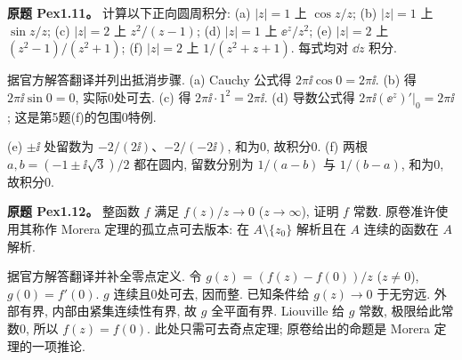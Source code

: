 \begin{exercise}\label{ass:pex1-11}
\textbf{原题 Pex1.11。} 计算以下正向圆周积分: (a) $|z|=1$ 上 $\cos z/z$; (b) $|z|=1$ 上 $\sin z/z$; (c) $|z|=2$ 上 $z^2/(z-1)$; (d) $|z|=1$ 上 $\ee^z/z^2$; (e) $|z|=2$ 上 $(z^2-1)/(z^2+1)$; (f) $|z|=2$ 上 $1/(z^2+z+1)$. 每式均对 $\dd z$ 积分.
\end{exercise}
\begin{solution}
据官方解答翻译并列出抵消步骤. (a) Cauchy 公式得 $2\pi\ii\cos0=2\pi\ii$. (b) 得 $2\pi\ii\sin0=0$, 实际0处可去. (c) 得 $2\pi\ii\cdot1^2=2\pi\ii$. (d) 导数公式得 $2\pi\ii(\ee^z)'|_0=2\pi\ii$; 这是第5题(f)的包围0特例.

(e) $\pm\ii$ 处留数为 $-2/(2\ii)$、$-2/(-2\ii)$, 和为0, 故积分0. (f) 两根 $a,b=(-1\pm\ii\sqrt3)/2$ 都在圆内, 留数分别为 $1/(a-b)$ 与 $1/(b-a)$, 和为0, 故积分0.
\end{solution}
\begin{exercise}\label{ass:pex1-12}
\textbf{原题 Pex1.12。} 整函数 $f$ 满足 $f(z)/z\to0$ ($z\to\infty$), 证明 $f$ 常数. 原卷准许使用其称作 Morera 定理的孤立点可去版本: 在 $A\setminus\{z_0\}$ 解析且在 $A$ 连续的函数在 $A$ 解析.
\end{exercise}
\begin{solution}
据官方解答翻译并补全零点定义. 令 $g(z)=(f(z)-f(0))/z$ ($z\ne0$), $g(0)=f'(0)$. $g$ 连续且0处可去, 因而整. 已知条件给 $g(z)\to0$ 于无穷远. 外部有界, 内部由紧集连续性有界, 故 $g$ 全平面有界. Liouville 给 $g$ 常数, 极限给此常数0, 所以 $f(z)=f(0)$. 此处只需可去奇点定理; 原卷给出的命题是 Morera 定理的一项推论.
\end{solution}
